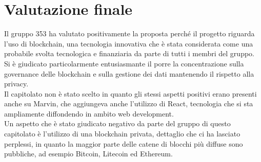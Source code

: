 \documentclass[StudioDiFattibilità.tex]{subfiles}
\begin{document}
\section{Valutazione finale}
Il gruppo 353 ha valutato positivamente la proposta perché il progetto riguarda l'uso di blockchain, una tecnologia innovativa che è stata considerata come una probabile svolta tecnologica e finanziaria da parte di tutti i membri del gruppo.\\
Si è giudicato particolarmente entusiasmante il porre la concentrazione sulla governance delle blockchain e sulla gestione dei dati mantenendo il rispetto alla privacy.\\
Il capitolato non è stato scelto in quanto gli stessi aspetti positivi erano presenti anche su Marvin, che aggiungeva anche l'utilizzo di React, tecnologia che si sta ampliamente diffondendo in ambito web development.\\
Un aspetto che è stato giudicato negativo da parte del gruppo di questo capitolato è l'utilizzo di una blockchain privata, dettaglio che ci ha lasciato perplessi, in quanto la maggior parte delle catene di blocchi più diffuse sono pubbliche, ad esempio Bitcoin, Litecoin ed Ethereum.
\end{document}
